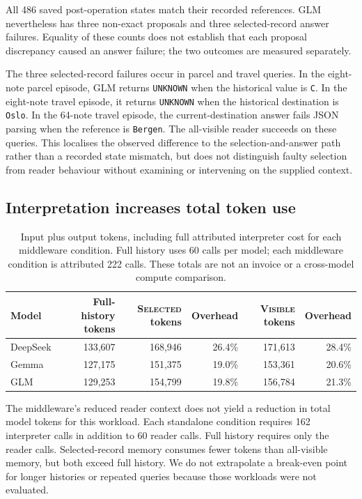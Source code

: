 \documentclass[11pt,a4paper]{article}
\newcommand{\sel}{\textsc{Selected}}
\newcommand{\vis}{\textsc{Visible}}
\begin{document}
All 486 saved post-operation states match their recorded references. GLM nevertheless has three non-exact proposals and three selected-record answer failures. Equality of these counts does not establish that each proposal discrepancy caused an answer failure; the two outcomes are measured separately.

The three selected-record failures occur in parcel and travel queries. In the eight-note parcel episode, GLM returns \texttt{UNKNOWN} when the historical value is \texttt{C}. In the eight-note travel episode, it returns \texttt{UNKNOWN} when the historical destination is \texttt{Oslo}. In the 64-note travel episode, the current-destination answer fails JSON parsing when the reference is \texttt{Bergen}. The all-visible reader succeeds on these queries. This localises the observed difference to the selection-and-answer path rather than a recorded state mismatch, but does not distinguish faulty selection from reader behaviour without examining or intervening on the supplied context.

\subsection{Interpretation increases total token use}
\begin{table}[ht]
\centering\small
\begin{tabular}{lrrrrr}
\toprule
Model & Full-history tokens & \sel{} tokens & Overhead & \vis{} tokens & Overhead \\
\midrule
DeepSeek & 133,607 & 168,946 & 26.4\% & 171,613 & 28.4\% \\
Gemma & 127,175 & 151,375 & 19.0\% & 153,361 & 20.6\% \\
GLM & 129,253 & 154,799 & 19.8\% & 156,784 & 21.3\% \\
\bottomrule
\end{tabular}
\caption{Input plus output tokens, including full attributed interpreter cost for each middleware condition. Full history uses 60 calls per model; each middleware condition is attributed 222 calls. These totals are not an invoice or a cross-model compute comparison.}
\label{tab:tokens}
\end{table}

The middleware's reduced reader context does not yield a reduction in total model tokens for this workload. Each standalone condition requires 162 interpreter calls in addition to 60 reader calls. Full history requires only the reader calls. Selected-record memory consumes fewer tokens than all-visible memory, but both exceed full history. We do not extrapolate a break-even point for longer histories or repeated queries because those workloads were not evaluated.
\end{document}
